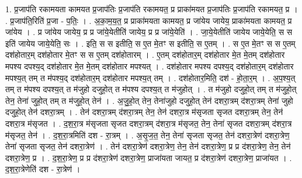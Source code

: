 \documentclass[17pt]{extarticle}
\begin{document}
1. प्र॒जाप॑ति रकामयता कामयत प्र॒जाप॑तिः प्र॒जाप॑ति रकामयत॒ प्र प्राका॑मयत प्र॒जाप॑तिः प्र॒जाप॑ति रकामयत॒ प्र । . प्र॒जाप॑ति॒रिति॑ प्र॒जा - प॒तिः॒ । . अ॒का॒म॒य॒त॒ प्र प्राका॑मयता कामयत॒ प्र जा॑येय जायेय॒ प्राका॑मयता कामयत॒ प्र जा॑येय । . प्र जा॑येय जायेय॒ प्र प्र जा॑ये॒येतीति॑ जायेय॒ प्र प्र जा॑ये॒येति॑ । . जा॒ये॒येतीति॑ जायेय जाये॒येति॒ स स इति॑ जायेय जाये॒येति॒ सः । . इति॒ स स इतीति॒ स ए॒त मे॒तꣳ स इतीति॒ स ए॒तम् । . स ए॒त मे॒तꣳ स स ए॒तम् दश॑होतार॒म् दश॑होतार मे॒तꣳ स स ए॒तम् दश॑होतारम् । . ए॒तम् दश॑होतार॒म् दश॑होतार मे॒त मे॒तम् दश॑होतार मपश्य दपश्य॒द् दश॑होतार मे॒त मे॒तम् दश॑होतार मपश्यत् । . दश॑होतार मपश्य दपश्य॒द् दश॑होतार॒म् दश॑होतार मपश्य॒त् तम् त म॑पश्य॒द् दश॑होतार॒म् दश॑होतार मपश्य॒त् तम् । . दश॑होतार॒मिति॒ दश॑ - हो॒ता॒र॒म् । . अ॒प॒श्य॒त् तम् त म॑पश्य दपश्य॒त् त म॑जुहो दजुहो॒त् त म॑पश्य दपश्य॒त् त म॑जुहोत् । . त म॑जुहो दजुहो॒त् तम् त म॑जुहो॒त् तेन॒ तेना॑ जुहो॒त् तम् त म॑जुहो॒त् तेन॑ । . अ॒जु॒हो॒त् तेन॒ तेना॑जुहो दजुहो॒त् तेन॑ दशरा॒त्रम् द॑शरा॒त्रम् तेना॑ जुहो दजुहो॒त् तेन॑ दशरा॒त्रम् । . तेन॑ दशरा॒त्रम् द॑शरा॒त्रम् तेन॒ तेन॑ दशरा॒त्र म॑सृजता सृजत दशरा॒त्रम् तेन॒ तेन॑ दशरा॒त्र म॑सृजत । . द॒श॒रा॒त्र म॑सृजता सृजत दशरा॒त्रम् द॑शरा॒त्र म॑सृजत॒ तेन॒ तेना॑ सृजत दशरा॒त्रम् द॑शरा॒त्र म॑सृजत॒ तेन॑ । . द॒श॒रा॒त्रमिति॑ दश - रा॒त्रम् । . अ॒सृ॒ज॒त॒ तेन॒ तेना॑ सृजता सृजत॒ तेन॑ दशरा॒त्रेण॑ दशरा॒त्रेण॒ तेना॑ सृजता सृजत॒ तेन॑ दशरा॒त्रेण॑ । . तेन॑ दशरा॒त्रेण॑ दशरा॒त्रेण॒ तेन॒ तेन॑ दशरा॒त्रेण॒ प्र प्र द॑शरा॒त्रेण॒ तेन॒ तेन॑ दशरा॒त्रेण॒ प्र । . द॒श॒रा॒त्रेण॒ प्र प्र द॑शरा॒त्रेण॑ दशरा॒त्रेण॒ प्राजा॑यता जायत॒ प्र द॑शरा॒त्रेण॑ दशरा॒त्रेण॒ प्राजा॑यत । . द॒श॒रा॒त्रेणेति॑ दश - रा॒त्रेण॑ । \newline
\end{document}
